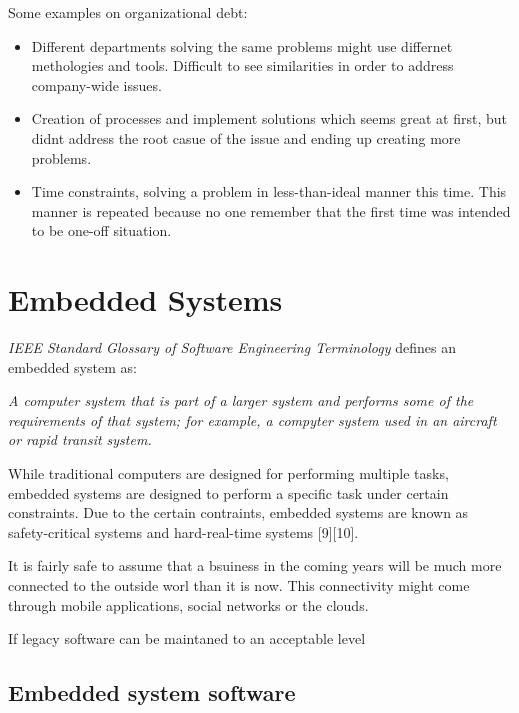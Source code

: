 Some examples on organizational debt:
\begin{itemize}
	\item Different departments solving the same problems might use differnet methologies and tools. Difficult to see similarities in order to address company-wide issues.
	\item Creation of processes and implement solutions which seems great at first, but didnt address the root casue of the issue and ending up creating more problems.
	\item Time constraints, solving a problem in less-than-ideal manner this time. This manner is repeated because no one remember that the first time was intended to be one-off situation.
\end{itemize}







\section{Embedded Systems}

\textit{IEEE Standard Glossary of Software Engineering Terminology}\cite{159342} defines an embedded system as:
\begin{displayquote}
	\textit{A computer system that is part of a larger system and performs some of the requirements of that system; for example, a compyter system used in an aircraft or rapid transit system.}
\end{displayquote}

While traditional computers are designed for performing multiple tasks, embedded systems are designed to perform a specific task under certain constraints. Due to the certain contraints, embedded systems are known as safety-critical systems and hard-real-time systems [9][10]. 




It is fairly safe to assume that a bsuiness in the coming years will be much more connected to the outside worl than it is now. This connectivity might come through mobile applications, social networks or the clouds. 

If legacy software can be maintaned to an acceptable level


\subsection{Embedded system software}

